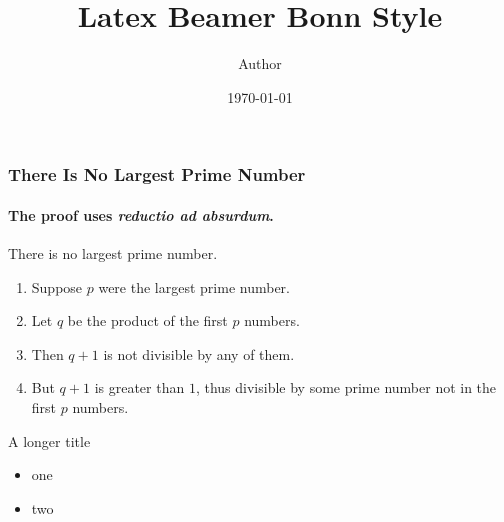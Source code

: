 \documentclass{beamer}
\title{Latex Beamer Bonn Style}
\date{\today}
\author{Author}
\begin{document}
	\begin{frame}[plain]
	\titlepage
\end{frame}


\begin{frame} 
\frametitle{There Is No Largest Prime Number} 
\framesubtitle{The proof uses \textit{reductio ad absurdum}.} 
\begin{theorem}
	There is no largest prime number. \end{theorem} 
\begin{enumerate} 
	\item<1-| alert@1> Suppose $p$ were the largest prime number. 
	\item<2-> Let $q$ be the product of the first $p$ numbers. 
	\item<3-> Then $q+1$ is not divisible by any of them. 
	\item<1-> But $q + 1$ is greater than $1$, thus divisible by some prime
	number not in the first $p$ numbers.
\end{enumerate}
\end{frame}

\begin{frame}{A longer title}
\begin{itemize}
\item one
\item two
\end{itemize}
\end{frame}
\end{document}
